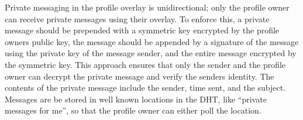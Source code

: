 \documentclass{sig-alternate}
\begin{document}
Private messaging in the profile overlay is unidirectional; only the profile
owner can receive private messages using their overlay.  To enforce this, a
private message should be prepended with a symmetric key encrypted by the
profile owners public key, the message should be appended by a signature of the
message using the private key of the message sender, and the entire message
encrypted by the symmetric key.  This approach ensures that only the sender and
the profile owner can decrypt the private message and verify the senders
identity.  The contents of the private message include the sender, time sent,
and the subject.  Messages are be stored in well known locations in the DHT,
like ``private messages for me'', so that the profile owner can either poll the
location.



\end{document}
